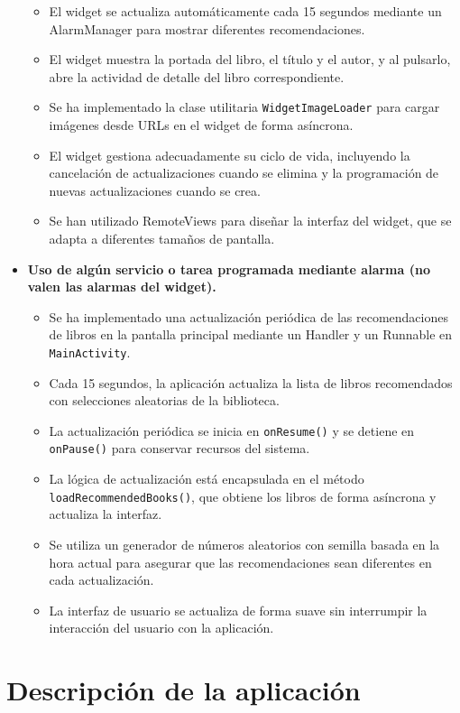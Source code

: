 \documentclass[a4paper,11pt]{report}
\begin{document}
\begin{itemize}
\begin{itemize}
            \item El widget se actualiza automáticamente cada 15 segundos mediante un AlarmManager para mostrar diferentes recomendaciones.
            \item El widget muestra la portada del libro, el título y el autor, y al pulsarlo, abre la actividad de detalle del libro correspondiente.
            \item Se ha implementado la clase utilitaria \texttt{WidgetImageLoader} para cargar imágenes desde URLs en el widget de forma asíncrona.
            \item El widget gestiona adecuadamente su ciclo de vida, incluyendo la cancelación de actualizaciones cuando se elimina y la programación de nuevas actualizaciones cuando se crea.
            \item Se han utilizado RemoteViews para diseñar la interfaz del widget, que se adapta a diferentes tamaños de pantalla.
          \end{itemize}
        \item \textbf{Uso de algún servicio o tarea programada mediante alarma (no valen las alarmas del widget).}
          \begin{itemize}
            \item Se ha implementado una actualización periódica de las recomendaciones de libros en la pantalla principal mediante un Handler y un Runnable en \texttt{MainActivity}.
            \item Cada 15 segundos, la aplicación actualiza la lista de libros recomendados con selecciones aleatorias de la biblioteca.
            \item La actualización periódica se inicia en \texttt{onResume()} y se detiene en \texttt{onPause()} para conservar recursos del sistema.
            \item La lógica de actualización está encapsulada en el método \texttt{loadRecommendedBooks()}, que obtiene los libros de forma asíncrona y actualiza la interfaz.
            \item Se utiliza un generador de números aleatorios con semilla basada en la hora actual para asegurar que las recomendaciones sean diferentes en cada actualización.
            \item La interfaz de usuario se actualiza de forma suave sin interrumpir la interacción del usuario con la aplicación.
          \end{itemize}
      \end{itemize}
  \chapter{Descripción de la aplicación}
\end{document}
